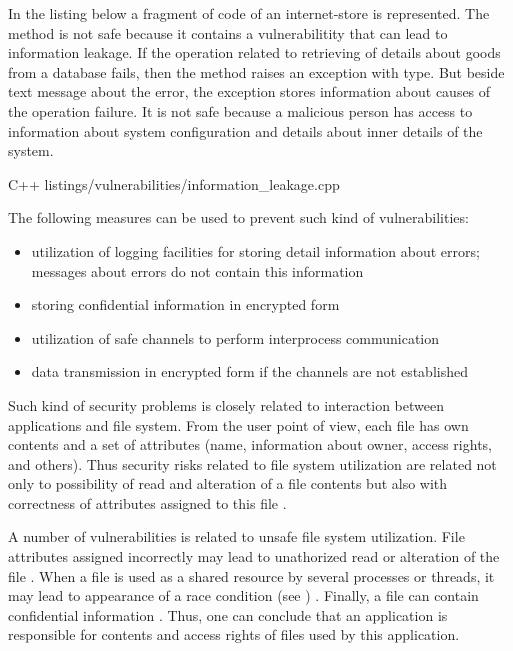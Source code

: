 %
In the listing below a fragment of code of an internet-store is represented. 
%
The  method is not safe because it contains a vulnerabilitity that can lead to information leakage. 
%
If the operation related to retrieving of details about goods from a database fails, then the method raises an exception with  type. 
%
But beside text message about the error, the exception stores information about causes of the operation failure. 
%
It is not safe because a malicious person has access to information about system configuration and details about inner details of the system. 

{}
	{C++}
	{listings/vulnerabilities/information_leakage.cpp}

%
The following measures can be used to prevent such kind of vulnerabilities: 
%
\begin{itemize}
	\item utilization of logging facilities for storing detail information about errors; messages about errors do not contain this information
	\item storing confidential information in encrypted form
	\item utilization of safe channels to perform interprocess communication
	\item data transmission in encrypted form if the channels are not established
\end{itemize}



%
Such kind of security problems is closely related to interaction between applications and file system. 
%
From the user point of view, each file has own contents and a set of attributes (name, information about owner, access rights, and others). 
%
Thus security risks related to file system utilization are related not only to possibility of read and alteration of a file contents but also with correctness of attributes assigned to this file . 

%
A number of vulnerabilities is related to unsafe file system utilization. 
%
File attributes assigned incorrectly may lead to unathorized read or alteration of the file . 
%
When a file is used as a shared resource by several processes or threads, it may lead to appearance of a race condition (see )  . 
%
Finally, a file can contain confidential information . 
%
Thus, one can conclude that an application is responsible for contents and access rights of files used by this application. 

